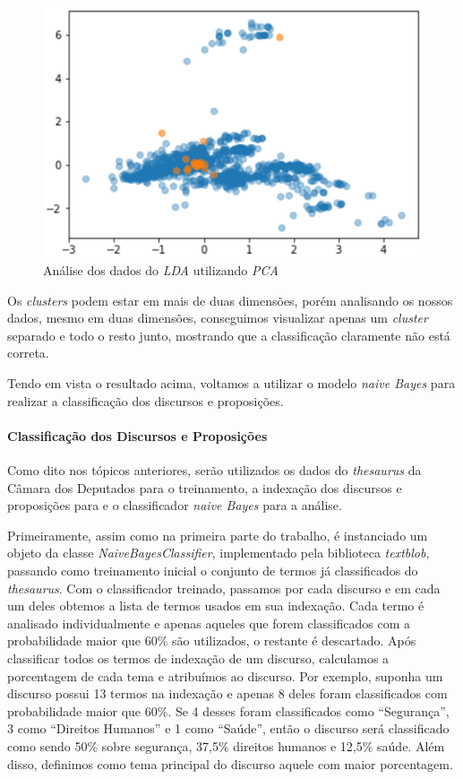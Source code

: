 \begin{figure}[h]
    \centering
    \includegraphics[scale=0.5]{figuras/pca.eps}
    \caption{Análise dos dados do \textit{LDA} utilizando \textit{PCA}}
\end{figure}

Os \textit{clusters} podem estar em mais de duas dimensões, porém analisando os nossos dados, mesmo em duas dimensões, conseguimos visualizar  apenas um \textit{cluster} separado e todo o resto junto, mostrando que a classificação claramente não está correta.

Tendo em vista o resultado acima, voltamos a utilizar o modelo \textit{naive Bayes} para realizar a classificação dos discursos e proposições.

\paragraph{Classificação dos Discursos e Proposições}

Como dito nos tópicos anteriores, serão utilizados os dados do \textit{thesaurus} da Câmara dos Deputados para o treinamento, a indexação dos discursos e proposições para e o classificador \textit{naive Bayes} para a análise.

Primeiramente, assim como na primeira parte do trabalho, é instanciado um objeto da classe \textit{NaiveBayesClassifier}, implementado pela biblioteca \textit{textblob}, passando como treinamento inicial o conjunto de termos já classificados do \textit{thesaurus}. Com o classificador treinado, passamos por cada discurso e em cada um deles obtemos a lista de termos usados em sua indexação. Cada termo é analisado individualmente e apenas aqueles que forem classificados com a probabilidade maior que 60\% são utilizados, o restante é descartado. Após classificar todos os termos de indexação de um discurso, calculamos a porcentagem de cada tema e atribuímos ao discurso. Por exemplo, suponha um discurso possui 13 termos na indexação e apenas 8 deles foram classificados com probabilidade maior que 60\%. Se 4 desses foram classificados como ``Segurança'', 3 como ``Direitos Humanos'' e 1 como ``Saúde'', então o discurso será classificado como sendo 50\% sobre segurança, 37,5\% direitos humanos e 12,5\% saúde. Além disso, definimos como tema principal do discurso aquele com maior porcentagem.


